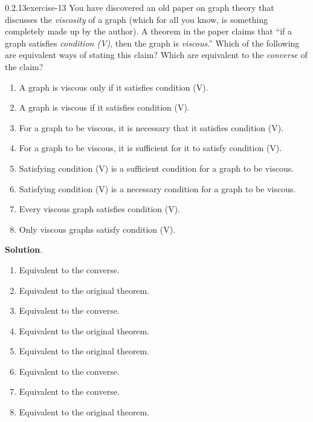 \documentclass[twoside,11pt,]{book}
\numberwithin{equation}{chapter}
\begin{document}
\begin{divisionsolution}{0.2.13}{}{exercise-13}%
\hypertarget{p-336}{}%
You have discovered an old paper on graph theory that discusses the \emph{viscosity} of a graph (which for all you know, is something completely made up by the author). A theorem in the paper claims that ``if a graph satisfies \emph{condition (V)}, then the graph is \emph{viscous}.'' Which of the following are equivalent ways of stating this claim? Which are equivalent to the \emph{converse} of the claim?\leavevmode%
\begin{enumerate}[label=(\alph*)]
\item\hypertarget{li-341}{}\hypertarget{p-337}{}%
A graph is viscous only if it satisfies condition (V). %
\item\hypertarget{li-346}{}\hypertarget{p-338}{}%
A graph is viscous if it satisfies condition (V). %
\item\hypertarget{li-351}{}\hypertarget{p-339}{}%
For a graph to be viscous, it is necessary that it satisfies condition (V). %
\item\hypertarget{li-356}{}\hypertarget{p-340}{}%
For a graph to be viscous, it is sufficient for it to satisfy condition (V). %
\item\hypertarget{li-361}{}\hypertarget{p-341}{}%
Satisfying condition (V) is a sufficient condition for a graph to be viscous. %
\item\hypertarget{li-366}{}\hypertarget{p-342}{}%
Satisfying condition (V) is a necessary condition for a graph to be viscous. %
\item\hypertarget{li-371}{}\hypertarget{p-343}{}%
Every viscous graph satisfies condition (V). %
\item\hypertarget{li-376}{}\hypertarget{p-344}{}%
Only viscous graphs satisfy condition (V). %
\end{enumerate}
%
\par\smallskip%
\noindent\textbf{Solution}.\quad%
\hypertarget{p-345}{}%
\leavevmode%
\begin{enumerate}[label=(\alph*)]
\item\hypertarget{li-381}{}\hypertarget{p-346}{}%
Equivalent to the converse.%
\item\hypertarget{li-382}{}\hypertarget{p-347}{}%
Equivalent to the original theorem.%
\item\hypertarget{li-383}{}\hypertarget{p-348}{}%
Equivalent to the converse.%
\item\hypertarget{li-384}{}\hypertarget{p-349}{}%
Equivalent to the original theorem.%
\item\hypertarget{li-385}{}\hypertarget{p-350}{}%
Equivalent to the original theorem.%
\item\hypertarget{li-386}{}\hypertarget{p-351}{}%
Equivalent to the converse.%
\item\hypertarget{li-387}{}\hypertarget{p-352}{}%
Equivalent to the converse.%
\item\hypertarget{li-388}{}\hypertarget{p-353}{}%
Equivalent to the original theorem.%
\end{enumerate}
%
\end{divisionsolution}%
\end{document}
